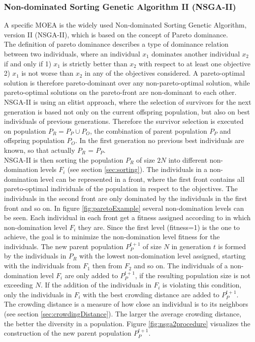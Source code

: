     \subsubsection{Non-dominated Sorting Genetic Algorithm II (NSGA-II)}
    A specific MOEA is the widely used Non-dominated Sorting Genetic Algorithm, version II (NSGA-II)\cite{Deb:2002}, which is based on the concept of Pareto dominance.\\
    The definition of pareto dominance describes a type of dominance relation between two individuals, where an individual $x_1$ dominates another individual $x_2$ if and only if 1) $x_1$ is strictly better than $x_2$ with respect to at least one objective 2) $x_1$ is not worse than $x_2$ in any of the objectives considered\cite{clune2013evolutionary}. A pareto-optimal solution is therefore pareto-dominant over any non-pareto-optimal solution, while pareto-optimal solutions on the pareto-front are non-dominant to each other.\\
    NSGA-II is using an elitist approach, where the selection of survivors for the next generation is based not only on the current offspring population, but also on best individuals of previous generations. Therefore the survivor selection is executed on population $P_R = P_P \cup P_O$, the combination of parent population $P_P$ and offspring population $P_O$. In the first generation no previous best individuals are known, so that actually $P_R$ = $P_P$.\\
    NSGA-II is then sorting the population $P_R$ of size $2N$ into different non-domination levels $F_i$ (see section \ref{sec:sorting}). The individuals in a non-domination level can be represented in a front, where the first front contains all pareto-optimal individuals of the population in respect to the objectives. The individuals in the second front are only dominated by the individuals in the first front and so on. In figure \ref{fig:paretoExample} several non-domination levels can be seen. Each individual in each front get a fitness assigned according to in which non-domination level $F_i$ they are. Since the first level (fitness=1) is the one to achieve, the goal is to minimize the non-domination level fitness for the individuals. The new parent population $P_{P}^{t+1}$ of size $N$ in generation $t$ is formed by the individuals in $P_R$ with the lowest non-domination level assigned, starting with the individuals from $F_1$ then from $F_2$ and so on. The individuals of a non-domination level $F_i$ are only added to $P_{P}^{t+1}$, if the resulting population size is not exceeding $N$. If the addition of the individuals in $F_i$ is violating this condition, only the individuals in $F_i$ with the best crowding distance are added to $P_{P}^{t+1}$. The crowding distance is a measure of how close an individual is to its neighbors (see section \ref{sec:crowdingDistance}). The larger the average crowding distance, the better the diversity in a population. Figure \ref{fig:nsga2procedure} visualizes the construction of the new parent population $P_{P}^{t+1}$.

